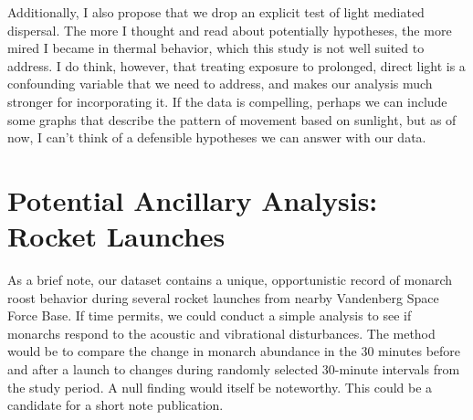 Additionally, I also propose that we drop an explicit test of light mediated dispersal. The more I thought and read about potentially hypotheses, the more mired I became in thermal behavior, which this study is not well suited to address. I do think, however, that treating exposure to prolonged, direct light is a confounding variable that we need to address, and makes our analysis much stronger for incorporating it. If the data is compelling, perhaps we can include some graphs that describe the pattern of movement based on sunlight, but as of now, I can't think of a defensible hypotheses we can answer with our data. 

\section{Potential Ancillary Analysis: Rocket Launches}

As a brief note, our dataset contains a unique, opportunistic record of monarch roost behavior during several rocket launches from nearby Vandenberg Space Force Base. If time permits, we could conduct a simple analysis to see if monarchs respond to the acoustic and vibrational disturbances. The method would be to compare the change in monarch abundance in the 30 minutes before and after a launch to changes during randomly selected 30-minute intervals from the study period. A null finding would itself be noteworthy. This could be a candidate for a short note publication.

